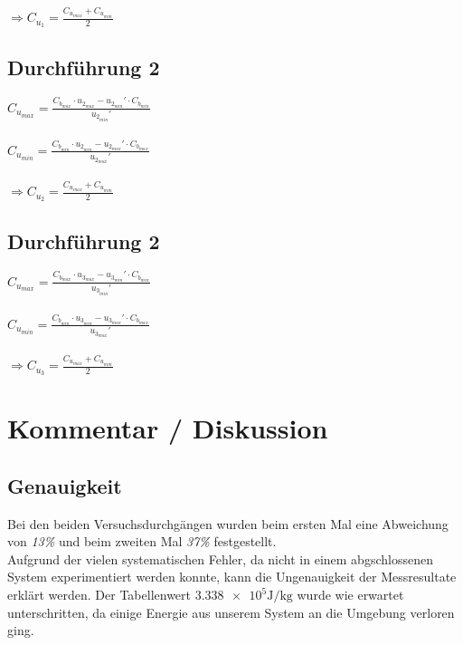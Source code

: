 \documentclass[a4paper,12pt]{article}
\begin{document}
$\Rightarrow C_{u_1}=\displaystyle{\frac{C_{u_{max}}+C_{u_{min}}}{2}}$

\subsection{Durchführung 2}

$C_{u_{max}} = \displaystyle{\frac{C_{b_{max}}\cdot u_{2_{max}}-u_{2_{min}}'\cdot C_{b_{min}}}{u_{2_{min}}'}}$\\\\

$C_{u_{min}} = \displaystyle{\frac{C_{b_{min}}\cdot u_{2_{min}}-u_{2_{max}}'\cdot C_{b_{max}}}{u_{2_{max}}'}}$\\\\

$\Rightarrow C_{u_2}=\displaystyle{\frac{C_{u_{max}}+C_{u_{min}}}{2}}$

\subsection{Durchführung 2}

$C_{u_{max}} = \displaystyle{\frac{C_{b_{max}}\cdot u_{3_{max}}-u_{3_{min}}'\cdot C_{b_{min}}}{u_{3_{min}}'}}$\\\\

$C_{u_{min}} = \displaystyle{\frac{C_{b_{min}}\cdot u_{3_{min}}-u_{3_{max}}'\cdot C_{b_{max}}}{u_{3_{max}}'}}$\\\\

$\Rightarrow C_{u_3}=\displaystyle{\frac{C_{u_{max}}+C_{u_{min}}}{2}}$

\section{Kommentar / Diskussion}

\subsection{Genauigkeit}
Bei den beiden Versuchsdurchgängen wurden beim ersten Mal eine Abweichung von \textit{13\%} und beim zweiten Mal \textit{37\%} festgestellt.\\

Aufgrund der vielen systematischen Fehler, da nicht in einem abgschlossenen System experimentiert werden konnte, kann die Ungenauigkeit der Messresultate erklärt werden. Der Tabellenwert $\num{3.338 e5}\si{\J\per\kg}$ \cite{formelsammlung} wurde wie erwartet unterschritten, da einige Energie aus unserem System an die Umgebung verloren ging.\\
\end{document}
